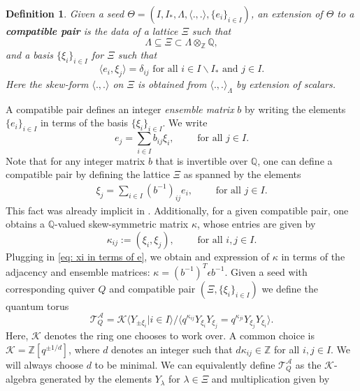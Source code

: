 \documentclass[a4paper]{article}
\numberwithin{equation}{section}
\newtheorem{definition}[counter]{Definition}
\newcommand{\1}{{\mathrm{1}\mkern-4mu{\mathchoice{}{}{\mskip-0.5mu}{\mskip-1mu}}\mathrm{l}}}
\newcommand{\ZZ}{\mathbb{Z}}
\begin{document}
\begin{definition}
    Given a seed $ \Theta = (I,I_{\ast}, \Lambda, \langle.,.\rangle,\{e_i\}_{i\in I})$, an extension of $\Theta$ to a \emph{\bf compatible pair} is the data of a lattice $\Xi$ such that 
    \begin{equation}
        \Lambda \subseteq \Xi\subset \Lambda \otimes_{\ZZ} \mathbb{Q},
    \end{equation}
    and a basis $\{\xi_i\}_{i\in I}$ for $\Xi$ such that 
    \begin{equation}
        \langle e_i, \xi_j\rangle = \delta_{ij} \text{ for all } i \in I\backslash I_\ast \text{ and } j \in I.
    \end{equation}
    Here the skew-form $\langle.,.\rangle$ on $\Xi$ is obtained from $\langle.,.\rangle_{\Lambda}$ by extension of scalars.
\end{definition}
A compatible pair defines an integer \emph{ensemble matrix} $b$ by writing the elements $\{e_i\}_{i\in I}$ in terms of the basis $\{\xi_i\}_{i\in I}$. We write
\begin{equation}
    e_j = \sum_{i\in I} b_{ij}\xi_i, \qquad \text{  for all $j \in I$}.
\end{equation}
Note that for any integer matrix $b$ that is invertible over $\mathbb{Q}$, one can define a compatible pair by defining the lattice $\Xi$ as spanned by the elements
\begin{align}\label{eq: xi in terms of e}
    \xi_j =\sum_{i\in I} (b^{-1})_{ij}e_i, \qquad \text{  for all $j \in I$}.
\end{align}
This fact was already implicit in \cite{SS25}.
Additionally, for a given compatible pair, one obtains a $\mathbb{Q}$-valued skew-symmetric matrix $\kappa$, whose entries are given by 
\begin{equation}
    \kappa_{ij} := (\xi_i,\xi_j),\qquad \text{  for all $i,j \in I$}.
\end{equation}
Plugging in \eqref{eq: xi in terms of e}, we obtain and expression of $\kappa$ in terms of the adjacency and ensemble matrices: $\kappa = (b^{-1})^T\epsilon b^{-1}$.
Given a seed with corresponding quiver $Q$ and compatible pair $(\Xi,\{\xi_i\}_{i\in I})$ we define the quantum torus
\begin{equation}
    \mathcal{T}_Q^\mathcal{A} = \mathcal{K}\langle Y_{\pm\xi_i} | i \in I\rangle/\langle q^{\kappa_{ij}}Y_{\xi_i}Y_{\xi_j} = q^{\kappa_{ji}}Y_{\xi_j}Y_{\xi_i}  \rangle.
\end{equation}
 Here, $\mathcal{K}$ denotes the ring one chooses to work over. A common choice is $\mathcal{K} = \ZZ[q^{\pm1/d}]$, where $d$ denotes an integer such that $d\kappa_{ij} \in \ZZ$ for all $i,j \in I$. We will always choose $d$ to be minimal. We can equivalently define $\mathcal{T}_{Q}^{\mathcal{A}}$ as the $\mathcal{K}$-algebra generated by the elements $Y_{\lambda}$ for $\lambda \in \Xi$ and multiplication given by 
\end{document}
